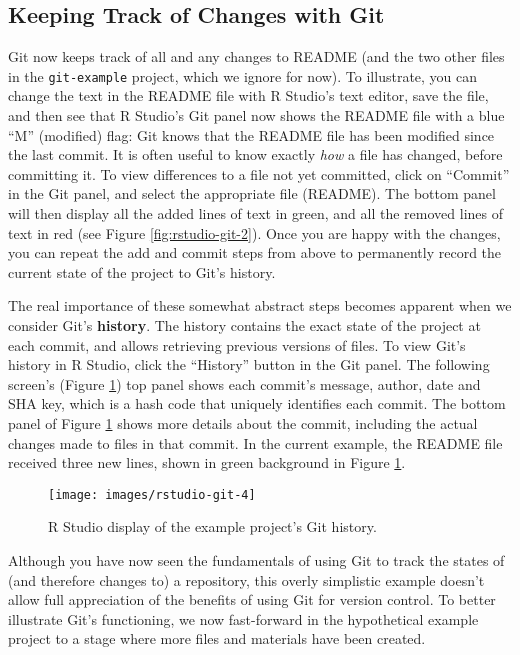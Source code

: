 \documentclass[
  american,
  ,doc,floatsintext]{apa6}
\begin{document}
\hypertarget{keeping-track-of-changes-with-git}{%
\subsection{Keeping Track of Changes with Git}\label{keeping-track-of-changes-with-git}}

Git now keeps track of all and any changes to README (and the two other files in the \texttt{git-example} project, which we ignore for now). To illustrate, you can change the text in the README file with R Studio's text editor, save the file, and then see that R Studio's Git panel now shows the README file with a blue ``M'' (modified) flag: Git knows that the README file has been modified since the last commit. It is often useful to know exactly \emph{how} a file has changed, before committing it. To view differences to a file not yet committed, click on ``Commit'' in the Git panel, and select the appropriate file (README). The bottom panel will then display all the added lines of text in green, and all the removed lines of text in red (see Figure \ref{fig:rstudio-git-2}). Once you are happy with the changes, you can repeat the add and commit steps from above to permanently record the current state of the project to Git's history.

The real importance of these somewhat abstract steps becomes apparent when we consider Git's \textbf{history}. The history contains the exact state of the project at each commit, and allows retrieving previous versions of files. To view Git's history in R Studio, click the ``History'' button in the Git panel. The following screen's (Figure \ref{fig:rstudio-git-4}) top panel shows each commit's message, author, date and SHA key, which is a hash code that uniquely identifies each commit. The bottom panel of Figure \ref{fig:rstudio-git-4} shows more details about the commit, including the actual changes made to files in that commit. In the current example, the README file received three new lines, shown in green background in Figure \ref{fig:rstudio-git-4}.

\begin{figure}

{\centering \texttt{[image: images/rstudio-git-4]} 

}

\caption{R Studio display of the example project's Git history.}\label{fig:rstudio-git-4}
\end{figure}

Although you have now seen the fundamentals of using Git to track the states of (and therefore changes to) a repository, this overly simplistic example doesn't allow full appreciation of the benefits of using Git for version control. To better illustrate Git's functioning, we now fast-forward in the hypothetical example project to a stage where more files and materials have been created.
\end{document}
